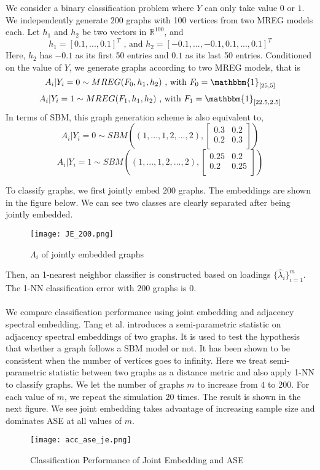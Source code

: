 \documentclass[10pt,journal,compsoc]{IEEEtran}
\begin{document}
\noindent We consider a binary classification problem where $Y$ can only take value $0$ or $1$. We independently generate $200$ graphs with 100 vertices from two MREG models each. Let $h_1$ and $h_2$ be two vectors in $\mathbb{R}^{100}$, and \[h_1=[0.1,...,0.1]^T \text{ , and } h_2=[-0.1,...,-0.1,0.1,...,0.1]^T \] 
Here, $h_2$ has $-0.1$ as its first 50 entries and $0.1$ as its last 50 entries. Conditioned on the value of $Y$, we generate graphs according to two MREG models, that is 
\[A_i|Y_i=0 \sim MREG(F_0,h_1,h_2) \text{ , with } F_0= \mathbbm{1}_{[25,5]} \]
\[A_i|Y_i=1 \sim MREG(F_1,h_1,h_2) \text{ , with } F_1= \mathbbm{1}_{[22.5,2.5]} \]
In terms of SBM, this graph generation scheme is also equivalent to,
\[ A_i|Y_i=0 \sim  SBM((1,...,1,2,...,2),\begin{bmatrix} 0.3 & 0.2 \\ 0.2 & 0.3 \\ \end{bmatrix})  \]
\[ A_i|Y_i=1 \sim  SBM((1,...,1,2,...,2),\begin{bmatrix} 0.25 & 0.2 \\ 0.2 & 0.25 \\ \end{bmatrix})\]

\noindent To classify graphs, we first jointly embed $200$ graphs. The embeddings are shown in the figure below. We can see two classes are clearly separated after being jointly embedded.
\begin{figure}[!htbp]
	\centering
	\texttt{[image: JE\_200.png]}
	\caption{$\Lambda_i$ of jointly embedded graphs}
\end{figure}
Then, an 1-nearest neighbor classifier is constructed based on loadings $\{\hat{\lambda}_i\}_{i=1}^m$. The 1-NN classification error with $200$ graphs is $0$. \\
\\
\noindent We compare classification performance using joint embedding and adjacency spectral embedding. Tang et al. \cite{tang2014semiparametric} introduces a semi-parametric statistic on adjacency spectral embeddings of two graphs. It is used to test the hypothesis that whether a graph follows a SBM model or not. It has been shown to be consistent when the number of vertices goes to infinity. Here we treat semi-parametric statistic between two graphs as a distance metric and also apply 1-NN to classify graphs. We let the number of graphs $m$ to increase from $4$ to $200$. For each value of $m$, we repeat the simulation $20$ times. The result is shown in the next figure. We see joint embedding takes advantage of increasing sample size and dominates ASE at all values of $m$. 
\begin{figure}[!htbp]
	\centering
	\texttt{[image: acc\_ase\_je.png]}
	\caption{Classification Performance of Joint Embedding and ASE}
\end{figure} 
\end{document}
